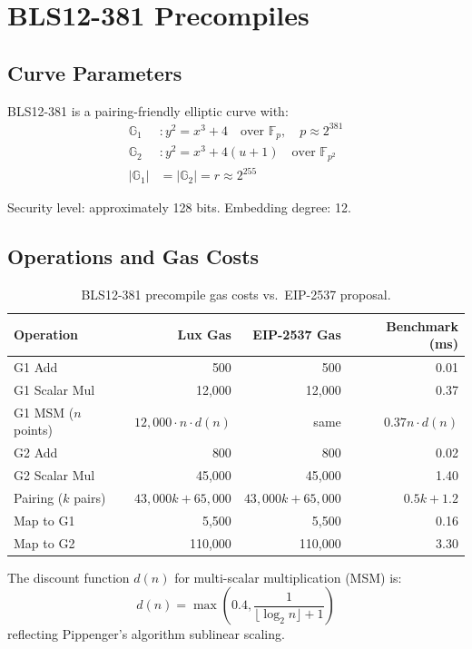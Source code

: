 \section{BLS12-381 Precompiles}
\label{sec:bls12381}

\subsection{Curve Parameters}

BLS12-381 \cite{bowe2017bls12381} is a pairing-friendly elliptic curve with:
\begin{align}
    \mathbb{G}_1 &: y^2 = x^3 + 4 \quad \text{over } \mathbb{F}_p, \quad p \approx 2^{381} \\
    \mathbb{G}_2 &: y^2 = x^3 + 4(u + 1) \quad \text{over } \mathbb{F}_{p^2} \\
    |\mathbb{G}_1| &= |\mathbb{G}_2| = r \approx 2^{255}
\end{align}

Security level: approximately 128 bits. Embedding degree: 12.

\subsection{Operations and Gas Costs}

\begin{table}[H]
\centering
\caption{BLS12-381 precompile gas costs vs.\ EIP-2537 proposal.}
\label{tab:bls_gas}
\begin{tabular}{lrrr}
\toprule
\textbf{Operation} & \textbf{Lux Gas} & \textbf{EIP-2537 Gas} & \textbf{Benchmark (ms)} \\
\midrule
G1 Add & 500 & 500 & 0.01 \\
G1 Scalar Mul & 12,000 & 12,000 & 0.37 \\
G1 MSM ($n$ points) & $12{,}000 \cdot n \cdot d(n)$ & same & $0.37n \cdot d(n)$ \\
G2 Add & 800 & 800 & 0.02 \\
G2 Scalar Mul & 45,000 & 45,000 & 1.40 \\
Pairing ($k$ pairs) & $43{,}000k + 65{,}000$ & $43{,}000k + 65{,}000$ & $0.5k + 1.2$ \\
Map to G1 & 5,500 & 5,500 & 0.16 \\
Map to G2 & 110,000 & 110,000 & 3.30 \\
\bottomrule
\end{tabular}
\end{table}

The discount function $d(n)$ for multi-scalar multiplication (MSM) is:
\begin{equation}
    d(n) = \max\left(0.4, \frac{1}{\lfloor \log_2 n \rfloor + 1}\right)
\end{equation}
reflecting Pippenger's algorithm sublinear scaling.

